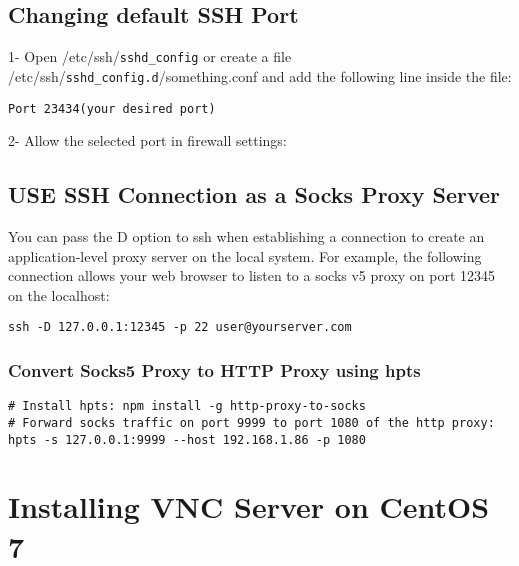 \documentclass{article}
\begin{document}
\subsection{Changing default SSH Port}
1- Open /etc/ssh/\lstinline{sshd_config} or create a file /etc/ssh/\lstinline{sshd_config.d}/something.conf and add the following line inside the file:  
\begin{verbatim}
Port 23434(your desired port)
\end{verbatim}
2- Allow the selected port in firewall settings:  

\subsection{USE SSH Connection as a Socks Proxy Server}
You can pass the D option to ssh when establishing a connection to create an application-level proxy server
on the local system. For example, the following connection allows your web browser to listen to a socks v5 proxy on port 12345 on the localhost:

\begin{verbatim}
ssh -D 127.0.0.1:12345 -p 22 user@yourserver.com
\end{verbatim}

\subsubsection{Convert Socks5 Proxy to HTTP Proxy using hpts}
\begin{verbatim}
# Install hpts: npm install -g http-proxy-to-socks
# Forward socks traffic on port 9999 to port 1080 of the http proxy: hpts -s 127.0.0.1:9999 --host 192.168.1.86 -p 1080 
\end{verbatim}


\section{Installing VNC Server on CentOS 7}
\end{document}
